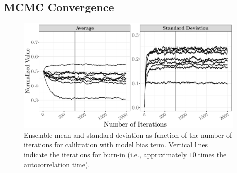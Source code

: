 \subsection{MCMC Convergence}\label{sub:bc_mcmc_convergence}

\begin{figure}[!bth]
    \centering
    \includegraphics[width=1.0\textwidth]{../figures/chapter5/figures/plotEnsStatMCMC}
    \caption[Ensemble mean and standard deviation as function of the number of iterations for calibration with model bias term.]{Ensemble mean and standard deviation as function of the number of iterations for calibration with model bias term. Vertical lines indicate the iterations for burn-in (i.e., approximately $10$ times the autocorrelation time).}
    \label{fig:ch5_plot_ens_stat_mcmc}
\end{figure}